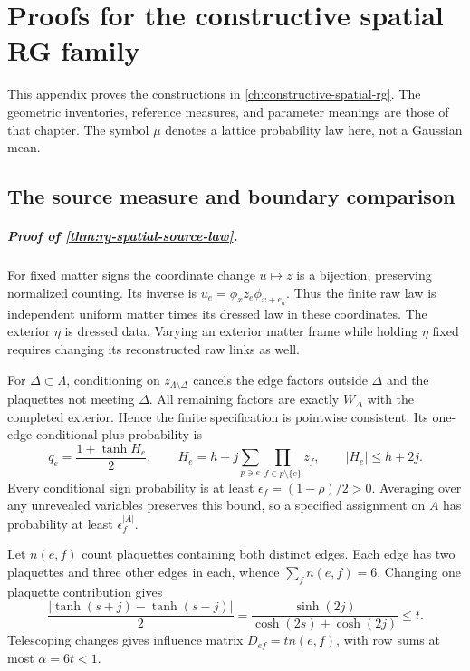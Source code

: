 \chapter{Proofs for the constructive spatial RG family}
\label{app:spatial-rg-proofs}

This appendix proves the constructions in
\cref{ch:constructive-spatial-rg}. The geometric inventories, reference
measures, and parameter meanings are those of that chapter. The symbol
\(\mu\) denotes a lattice probability law here, not a Gaussian mean.

\section{The source measure and boundary comparison}
\label{sec:rg-spatial-proof-measure}

\paragraph{Proof of \cref{thm:rg-spatial-source-law}.}
For fixed matter signs the coordinate change \(u\mapsto z\) is a
bijection, preserving normalized counting. Its inverse is
\(u_e=\phi_xz_e\phi_{x+e_a}\). Thus the finite raw law is independent
uniform matter times its dressed law in these coordinates. The exterior
\(\eta\) is dressed data. Varying an exterior matter frame while holding
\(\eta\) fixed requires changing its reconstructed raw links as well.

For \(\Delta\subset\Lambda\), conditioning on
\(z_{\Lambda\setminus\Delta}\) cancels the edge factors outside
\(\Delta\) and the plaquettes not meeting \(\Delta\). All remaining factors
are exactly \(W_\Delta\) with the completed exterior. Hence the finite
specification is pointwise consistent. Its one-edge conditional plus
probability is
\begin{equation}
 q_e=\frac{1+\tanh H_e}{2},\qquad
 H_e=h+j\sum_{p\ni e}\prod_{f\in p\setminus\{e\}}z_f,
 \qquad |H_e|\le h+2j.
 \label{eq:rg-spatial-proof-single-row}
\end{equation}
Every conditional sign probability is at least
\(\epsilon_f=(1-\rho)/2>0\). Averaging over any unrevealed variables
preserves this bound, so a specified assignment on \(A\) has probability
at least \(\epsilon_f^{|A|}\).

Let \(n(e,f)\) count plaquettes containing both distinct edges. Each edge
has two plaquettes and three other edges in each, whence
\(\sum_fn(e,f)=6\). Changing one plaquette contribution gives
\begin{equation}
 \frac{|\tanh(s+j)-\tanh(s-j)|}{2}
 =\frac{\sinh(2j)}{\cosh(2s)+\cosh(2j)}\le t.
 \label{eq:rg-spatial-proof-influence}
\end{equation}
Telescoping changes gives influence matrix \(D_{ef}=t n(e,f)\), with
row sums at most \(\alpha=6t<1\).

